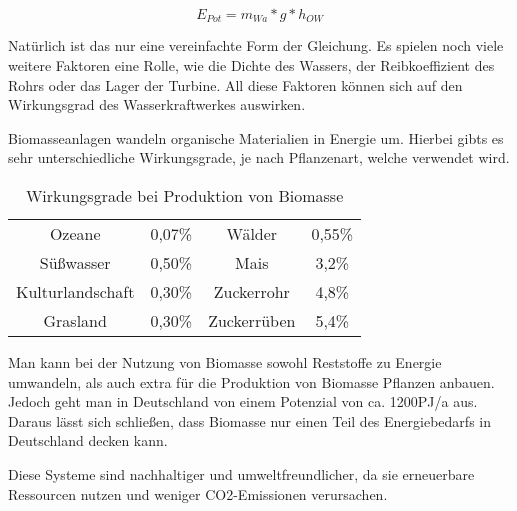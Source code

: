 \begin{equation*}
    E_{Pot} = m_{Wa} * g * h_{OW}
\end{equation*}

Natürlich ist das nur eine vereinfachte Form der Gleichung. Es spielen noch
viele weitere Faktoren eine Rolle, wie die Dichte des Wassers, der
Reibkoeffizient des Rohrs oder das Lager der Turbine. All diese Faktoren können
sich auf den Wirkungsgrad des Wasserkraftwerkes
auswirken.\cite{aufleger2020stromerzeugung}

Biomasseanlagen wandeln organische Materialien in Energie um. Hierbei gibts es
sehr unterschiedliche Wirkungsgrade, je nach Pflanzenart, welche verwendet
wird.

\begin{table}[h]
    \centering
    \captionsetup{font=small}
    \caption{Wirkungsgrade bei Produktion von Biomasse}
    \label{tab:tabelle1}
    \begin{tabular}{cc|cc}
        Ozeane           & 0,07\% & Wälder      & 0,55\% \\
        Süßwasser        & 0,50\% & Mais        & 3,2\%  \\
        Kulturlandschaft & 0,30\% & Zuckerrohr  & 4,8\%  \\
        Grasland         & 0,30\% & Zuckerrüben & 5,4\%
    \end{tabular}
\end{table}

Man kann bei der Nutzung von Biomasse sowohl Reststoffe zu Energie umwandeln,
als auch extra für die Produktion von Biomasse Pflanzen anbauen. Jedoch geht
man in Deutschland von einem Potenzial von ca. 1200PJ/a aus. Daraus lässt sich
schließen, dass Biomasse nur einen Teil des Energiebedarfs in Deutschland
decken kann. \cite{quaschning2021regenerative}

Diese Systeme sind nachhaltiger und umweltfreundlicher, da sie erneuerbare
Ressourcen nutzen und weniger CO2-Emissionen verursachen.